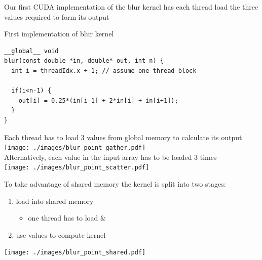 \begin{frame}[fragile]{}
    \begin{center}
        Our first CUDA implementation of the blur kernel has each thread load the three values required to form its output
    \end{center}
    \begin{code}{First implementation of blur kernel}
        \begin{lstlisting}[style=boxcudatiny]
__global__ void
blur(const double *in, double* out, int n) {
  int i = threadIdx.x + 1; // assume one thread block

  if(i<n-1) {
    out[i] = 0.25*(in[i-1] + 2*in[i] + in[i+1]);
  }
}
        \end{lstlisting}
    \end{code}

\end{frame}

\begin{frame}[fragile]{}
    \centering
    Each thread has to load 3 values from global memory to calculate its output \\
    \texttt{[image: ./images/blur\_point\_gather.pdf]} \\
    Alternatively, each value in the input array has to be loaded 3 times \\
    \texttt{[image: ./images/blur\_point\_scatter.pdf]} \\
\end{frame}

\begin{frame}[fragile]{}
    To take advantage of shared memory the kernel is split into two stages:
    \begin{enumerate}
        \item load  into shared memory 
        \begin{itemize}
            \item one thread has to load  \& 
        \end{itemize}
        \item use values  to compute kernel
    \end{enumerate}

    \begin{center}
        \texttt{[image: ./images/blur\_point\_shared.pdf]}
    \end{center}
\end{frame}

